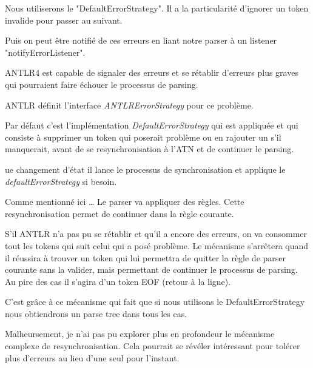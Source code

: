 \documentclass[
    iict, %
    il, %
]{heig-tb}
\begin{document}
Nous utiliserons le "DefaultErrorStrategy". Il a la particularité d'ignorer un token invalide pour passer au suivant.

Puis on peut être notifié de ces erreurs en liant notre parser à un listener "notifyErrorListener".




ANTLR4 est capable de signaler des erreurs et se rétablir d'erreurs plus graves qui pourraient faire échouer le processus de parsing.

ANTLR définit l'interface \emph{ANTLRErrorStrategy} pour ce problème.

Par défaut c'est l'implémentation \emph{DefaultErrorStrategy} qui est appliquée et qui consiste à supprimer un token qui poserait problème ou en rajouter un s'il manquerait, avant de
se resynchronisation à l'ATN et de continuer le parsing.

ue changement d'état  il lance le processus de synchronisation et applique le \emph{defaultErrorStrategy} si besoin.

Comme mentionné ici \dots
Le parser va appliquer des règles.
Cette resynchronisation permet de continuer dans la règle courante.

S'il ANTLR n'a pas pu se rétablir et qu'il a encore des erreurs, on va consommer tout les tokens qui suit celui qui a posé problème. 
Le mécanisme s'arrêtera quand il réussira à trouver un token qui lui permettra de quitter la règle de parser courante sans la valider, mais permettant de continuer le processus de parsing.
Au pire des cas il s'agira d'un token EOF (retour à la ligne).

C'est grâce à ce mécanisme qui fait que si nous utilisons le DefaultErrorStrategy nous obtiendrons un parse tree dans tous les cas.

Malheursement, je n'ai pas pu explorer plus en profondeur le mécanisme complexe de resynchronisation.
Cela pourrait se révéler intéressant pour tolérer plus d'erreurs au lieu d'une seul pour l'instant.

\end{document}
